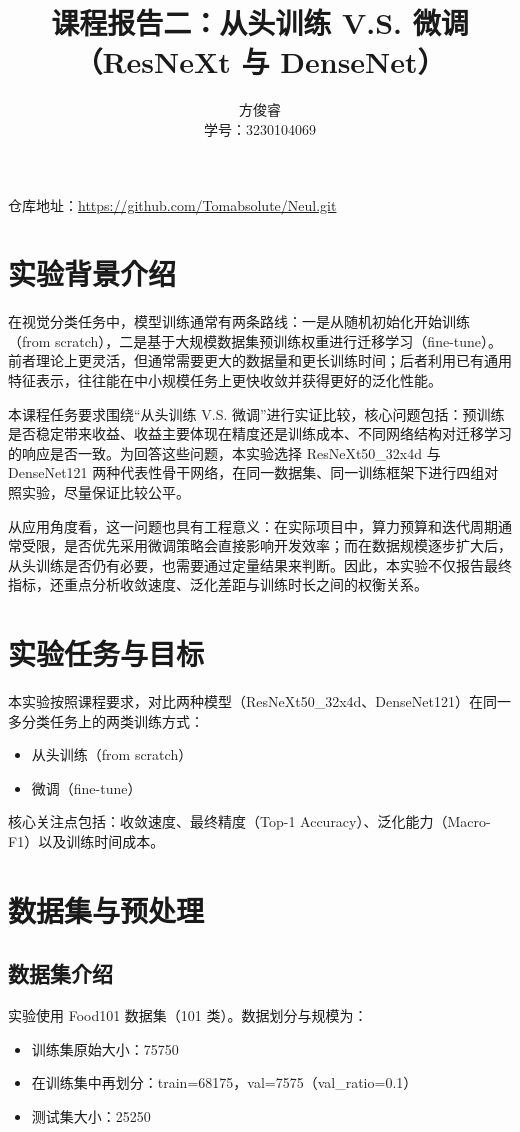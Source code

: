 \documentclass[a4paper,10pt,twocolumn]{article}
\title{课程报告二：从头训练 V.S. 微调（ResNeXt 与 DenseNet）}
\author{方俊睿\\学号：3230104069}
\date{}
\begin{document}
\maketitle

\noindent 仓库地址：\url{https://github.com/Tomabsolute/Neul.git}

\section{实验背景介绍}
在视觉分类任务中，模型训练通常有两条路线：一是从随机初始化开始训练（from scratch），二是基于大规模数据集预训练权重进行迁移学习（fine-tune）。前者理论上更灵活，但通常需要更大的数据量和更长训练时间；后者利用已有通用特征表示，往往能在中小规模任务上更快收敛并获得更好的泛化性能。

本课程任务要求围绕“从头训练 V.S. 微调”进行实证比较，核心问题包括：预训练是否稳定带来收益、收益主要体现在精度还是训练成本、不同网络结构对迁移学习的响应是否一致。为回答这些问题，本实验选择 ResNeXt50\_32x4d 与 DenseNet121 两种代表性骨干网络，在同一数据集、同一训练框架下进行四组对照实验，尽量保证比较公平。

从应用角度看，这一问题也具有工程意义：在实际项目中，算力预算和迭代周期通常受限，是否优先采用微调策略会直接影响开发效率；而在数据规模逐步扩大后，从头训练是否仍有必要，也需要通过定量结果来判断。因此，本实验不仅报告最终指标，还重点分析收敛速度、泛化差距与训练时长之间的权衡关系。

\section{实验任务与目标}
本实验按照课程要求，对比两种模型（ResNeXt50\_32x4d、DenseNet121）在同一多分类任务上的两类训练方式：
\begin{itemize}
  \item 从头训练（from scratch）
  \item 微调（fine-tune）
\end{itemize}
核心关注点包括：收敛速度、最终精度（Top-1 Accuracy）、泛化能力（Macro-F1）以及训练时间成本。

\section{数据集与预处理}
\subsection{数据集介绍}
实验使用 Food101 数据集（101 类）。数据划分与规模为：
\begin{itemize}
  \item 训练集原始大小：75750
  \item 在训练集中再划分：train=68175，val=7575（val\_ratio=0.1）
  \item 测试集大小：25250
\end{itemize}
\end{document}
